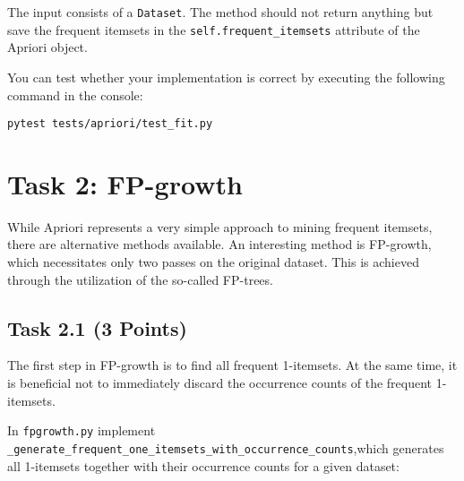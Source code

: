 \documentclass[
english,
smallborders
]{i6prcsht}
\newcommand{\points}[1]{\hfill \color{red}(#1 Points)\color{black}}
\begin{document}
\vspace*{0.5cm}

The input consists of a \texttt{Dataset}. The method should not return anything but save the frequent itemsets in the \texttt{self.frequent\_itemsets} attribute of the Apriori object.

You can test whether your implementation is correct by executing the following command in the console:

\vspace*{0.3cm}

\begin{lstlisting}
pytest tests/apriori/test_fit.py
\end{lstlisting}


\newpage

\section*{Task 2: FP-growth}
\label{sec:task-two}

While Apriori represents a very simple approach to mining frequent itemsets, there are alternative methods available. An interesting method is FP-growth, which necessitates only two passes on the original dataset. This is achieved through the utilization of the so-called FP-trees.

\subsection*{Task 2.1 \points{3}}

The first step in FP-growth is to find all frequent 1-itemsets. At the same time, it is beneficial not to immediately discard the occurrence counts of the frequent 1-itemsets.

In \texttt{fpgrowth.py} implement \texttt{\_generate\_frequent\_one\_itemsets\_with\_occurrence\_counts},\newline which generates all 1-itemsets together with their occurrence counts for a given dataset:

\vspace*{0.3cm}
\end{document}

